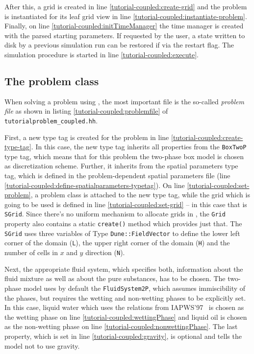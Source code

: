 After this, a grid is created in line
\ref{tutorial-coupled:create-grid} and the problem is instantiated for
its leaf grid view in line \ref{tutorial-coupled:instantiate-problem}.
Finally, on line \ref{tutorial-coupled:initTimeManager} the time
manager is created with the parsed starting parameters. If requested by
the user, a state written to disk by a previous simulation run can be 
restored if via the restart flag.
The simulation procedure is started in line
\ref{tutorial-coupled:execute}.

\subsection{The problem class}

When solving a problem using \Dumux, the most important file is the
so-called \textit{problem file} as shown in listing
\ref{tutorial-coupled:problemfile} of
\texttt{tutorialproblem\_coupled.hh}.

\begin{lst}\label{tutorial-coupled:problemfile} \mbox{}

\end{lst}

First, a new type tag is created for the problem in line
\ref{tutorial-coupled:create-type-tag}.  In this case, the new type
tag inherits all properties from the \texttt{BoxTwoP} type tag,
which means that for this problem the two-phase box model is chosen as
discretization scheme. Further, it inherits from the spatial parameters type tag,
 which is defined in the problem-dependent spatial parameters file (line \ref{tutorial-coupled:define-spatialparameters-typetag}). 
On line \ref{tutorial-coupled:set-problem}, a
problem class is attached to the new type tag, while the grid which
is going to be used is defined in line \ref{tutorial-coupled:set-grid} --
in this case that is  \texttt{SGrid}.  Since there's no uniform
mechanism to allocate grids in \Dune, the \texttt{Grid} property also contains
a static \texttt{create()} method which provides just that. The  \texttt{SGrid} uses three variables of 
Type \texttt{Dune::FieldVector} to define the lower left corner of the domain 
(\texttt{L}), the upper right corner of the domain (\texttt{H}) and the number 
of cells in $x$ and $y$ direction (\texttt{N}). 

Next, the appropriate fluid system, which specifies both, information about
the fluid mixture as well as about the pure substances, has to be chosen. 
The two-phase model uses by default the \texttt{FluidSystem2P}, which assumes 
immiscibility of the phases, but requires the wetting and non-wetting phases
to be explicitly set. In this case, liquid water which uses the relations from 
IAPWS'97~\cite{IAPWS1997} is chosen as the wetting phase on line
\ref{tutorial-coupled:wettingPhase} and liquid oil is chosen as the 
non-wetting phase on line \ref{tutorial-coupled:nonwettingPhase}. 
The last property, which is set in line
\ref{tutorial-coupled:gravity}, is optional and tells the model not to
use gravity.

